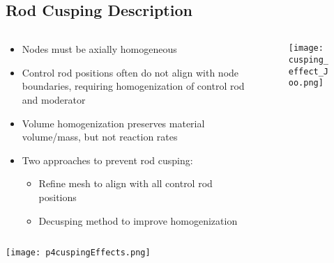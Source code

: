 \subsection{Rod Cusping Description}
\begin{frame}

\begin{columns}
\begin{column}{0.6\textwidth}
    \begin{itemize}
        \item Nodes must be axially homogeneous
        \item Control rod positions often do not align with node boundaries, 
        requiring homogenization of control rod and moderator
        \item Volume homogenization preserves material volume/mass, but not 
        reaction rates
        \item Two approaches to prevent rod cusping:
        \begin{itemize}
          \item Refine mesh to align with all control rod positions
          \item Decusping method to improve homogenization
        \end{itemize}
    \end{itemize}
\end{column}
\begin{column}{0.4\textwidth}
\begin{figure}[h]
  \centering
  \texttt{[image: cusping\_effect\_Joo.png]}
\end{figure} 
\end{column}
\end{columns}
    
\end{frame}


\begin{frame}
    
\begin{center}
    \texttt{[image: p4cuspingEffects.png]}
\end{center}
\vfill
    
\end{frame}



